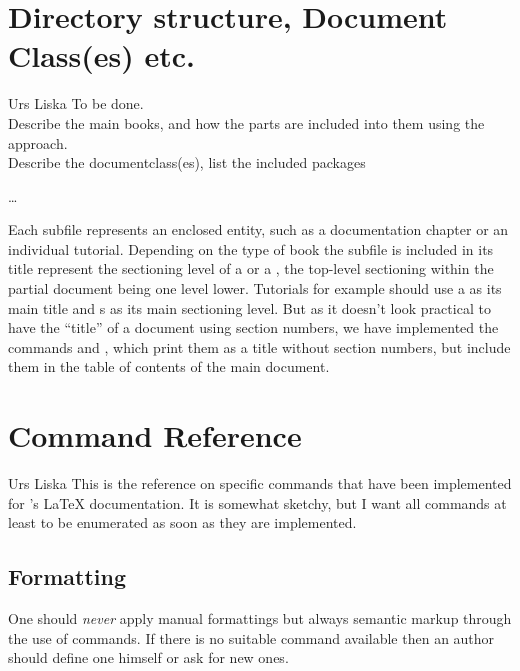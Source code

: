 \documentclass[openLilyLib_CG]{subfiles}
\begin{document}

\chapter{Directory structure, Document Class(es) etc.}

\begin{authorAbstract}{Urs Liska}
To be done.\\
Describe the main books, and how the parts are included into them using the  approach.\\
Describe the documentclass(es), list the included packages
\end{authorAbstract}

\bigskip

\noindent \dots

\bigskip
Each subfile represents an enclosed entity, such as a documentation chapter or an individual tutorial.
Depending on the type of book the subfile is included in its title represent the sectioning level of a  or a , the top-level sectioning within the partial document being one level lower.
Tutorials for example should use a  as its main title and s as its main sectioning level.
But as it doesn't look practical to have the “title” of a document using section numbers, we have implemented the commands  and , which print them as a title without section numbers, but include them in the table of contents of the main document.



\chapter{Command Reference}
\begin{authorAbstract}{Urs Liska}
This is the reference on specific commands that have been implemented for \openlilylib's \LaTeX{} documentation.
It is somewhat sketchy, but I want all commands at least to be enumerated as soon as they are implemented.
\end{authorAbstract}

\section{Formatting}
One should \emph{never} apply manual formattings but always semantic markup through the use of commands.
If there is no suitable command available then an author should define one himself or ask for new ones.
\end{document}
